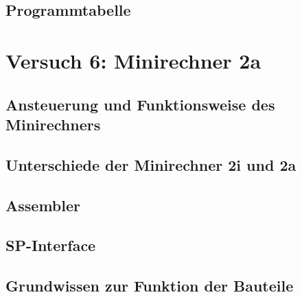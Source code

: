 \documentclass[paper=a4, fontsize=11pt]{scrartcl}
\numberwithin{equation}{section}
\numberwithin{figure}{section}
\numberwithin{table}{section}
\begin{document}

\subsection{Programmtabelle}


\newpage

\section{Versuch 6: Minirechner 2a}


\subsection{Ansteuerung und Funktionsweise des Minirechners}


\subsection{Unterschiede der Minirechner 2i und 2a}


\subsection{Assembler}


\subsection{SP-Interface}


\subsection{Grundwissen zur Funktion der Bauteile}

\end{document}
